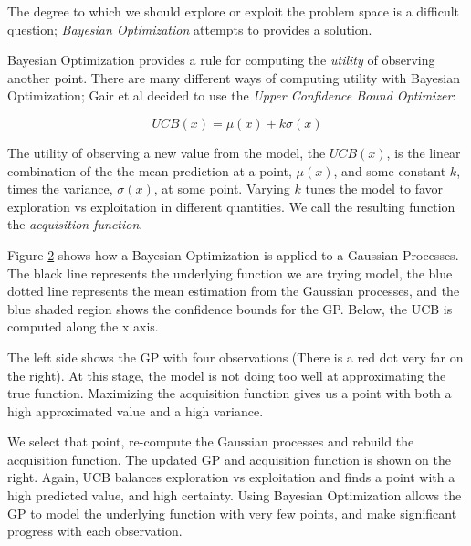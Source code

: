 \documentclass{sig-alternate}
\begin{document}
The degree to which we should explore or exploit the problem space is a difficult question;
\textit{Bayesian Optimization} attempts to provides a solution.

\begin{figure}[htb]
\centering
{}
\label{fig:t4}
\end{figure}

\begin{figure}[htb]
\centering
{}
\label{fig:BO5}
\caption{}
\end{figure}

Bayesian Optimization provides a rule for computing the \textit{utility} of observing another point.
There are many different ways of computing utility with Bayesian Optimization;
Gair et al decided to use the \textit{Upper Confidence Bound Optimizer}:

\[ UCB(x) = \mu(x) + k\sigma(x) \]

The utility of observing a new value from the model, the $UCB(x)$, is the linear combination of the the mean prediction at a point, $\mu(x)$, and some constant $k$, times the variance, $\sigma(x)$, at some point.
Varying $k$ tunes the model to favor exploration vs exploitation in different quantities. We call the resulting function the \textit{acquisition function}.

Figure \ref{fig:BO5} shows how a Bayesian Optimization is applied to a Gaussian Processes.
The black line represents the underlying function we are trying model, the blue dotted line represents the mean estimation from the Gaussian processes, and the blue shaded region shows the confidence bounds for the GP.
Below, the UCB is computed along the x axis.

The left side shows the GP with four observations (There is a red dot very far on the right).
At this stage, the model is not doing too well at approximating the true function.
Maximizing the acquisition function gives us a point with both a high approximated value and a high variance.

We select that point, re-compute the Gaussian processes and rebuild the acquisition function.
The updated GP and acquisition function is shown on the right.
Again, UCB balances exploration vs exploitation and finds a point with a high predicted value, and high certainty.
Using Bayesian Optimization allows the GP to model the underlying function with very few points, and make significant progress with each observation. 
\end{document}
